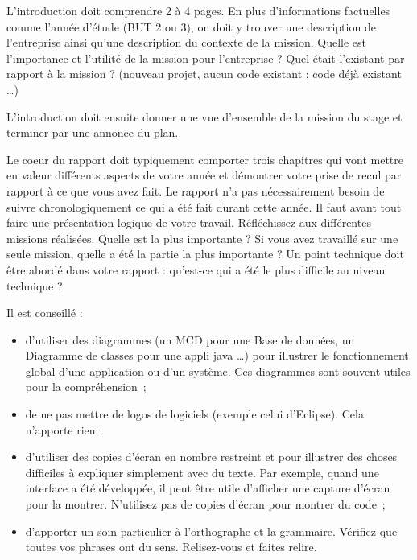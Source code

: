\documentclass[12pt,oneside,noprintercorrection]{iut}
\begin{document}
\begin{aide}{}{}
  L'introduction doit comprendre 2 à 4 pages. En plus d'informations factuelles comme l'année d'étude (BUT 2 ou 3), on doit y trouver une description de l'entreprise ainsi qu'une description du contexte de la mission. Quelle est l'importance et l'utilité de la mission pour l'entreprise ? Quel était l'existant par rapport à la mission ? (nouveau projet, aucun code existant ; code déjà existant \dots)

  L'introduction doit ensuite donner une vue d'ensemble de la mission du stage et terminer par une annonce du plan.

\end{aide}

\begin{aide}{}{}
  Le coeur du rapport doit typiquement comporter trois chapitres qui vont mettre en valeur différents aspects de votre année et démontrer votre prise de recul par rapport à ce que vous avez fait. Le rapport n'a pas nécessairement besoin de suivre chronologiquement ce qui a été fait durant cette année. Il faut avant tout faire une présentation logique de votre travail. Réfléchissez aux différentes missions réalisées. Quelle est la plus importante ? Si vous avez travaillé sur une seule mission, quelle a été la partie la plus importante ? Un point technique doit être abordé dans votre rapport : qu'est-ce qui a été le plus difficile au niveau technique ?

  Il est conseillé :
  \begin{itemize}
    \item  d'utiliser des diagrammes (un MCD pour une Base de données, un Diagramme de classes pour une appli java \dots) pour illustrer le fonctionnement global d'une application ou d'un système. Ces diagrammes sont souvent utiles pour la compréhension~;
    \item de ne pas mettre de logos de logiciels (exemple celui d'Eclipse). Cela n'apporte rien;
    \item d'utiliser des copies d'écran en nombre restreint et pour illustrer des choses difficiles à expliquer simplement avec du texte. Par exemple, quand une interface a été développée, il peut être utile d'afficher une capture d'écran pour la montrer. N'utilisez pas de copies d'écran pour montrer du code~;
    \item d'apporter un soin particulier à l'orthographe et la grammaire. Vérifiez que toutes vos phrases ont du sens. Relisez-vous et faites relire.
  \end{itemize}

\end{aide}
\end{document}

